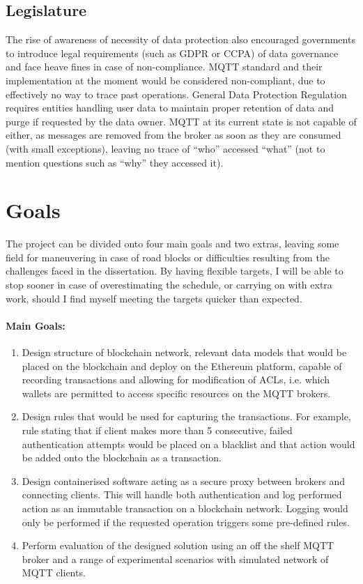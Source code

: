 \subsection{Legislature}
The rise of awareness of necessity of data protection also encouraged governments to introduce legal requirements (such as GDPR or CCPA) of data governance and face heave fines in case of non-compliance. MQTT standard and their implementation at the moment would be considered non-compliant, due to effectively no way to trace past operations. General Data Protection Regulation requires entities handling user data to maintain proper retention of data and purge if requested by the data owner. MQTT at its current state is not capable of either, as messages are removed from the broker as soon as they are consumed (with small exceptions), leaving no trace of ``who'' accessed ``what'' (not to mention questions such as ``why'' they accessed it).


\section{Goals}

The project can be divided onto four main goals and two extras, leaving some field for maneuvering in case of road blocks or difficulties resulting from the challenges faced in the dissertation. By having flexible targets, I will be able to stop sooner in case of overestimating the schedule, or carrying on with extra work, should I find myself meeting the targets quicker than expected. 

\paragraph{Main Goals:}
\begin{enumerate}
  \item Design structure of blockchain network, relevant data models that would be placed on the blockchain and deploy on the Ethereum platform, capable of recording transactions and allowing for modification of ACLs, i.e. which wallets are permitted to access specific resources on the MQTT brokers.
  \item Design rules that would be used for capturing the transactions. For example, rule stating that if client makes more than 5 consecutive, failed authentication attempts would be placed on a blacklist and that action would be added onto the blockchain as a transaction. 
  \item Design containerised software acting as a secure proxy between brokers and connecting clients. This will handle both authentication and log performed action as an immutable transaction on a blockchain network. Logging would only be performed if the requested operation triggers some pre-defined rules.
  \item Perform evaluation of the designed solution using an off the shelf MQTT broker and a range of experimental scenarios with simulated network of MQTT clients.
\end{enumerate}


